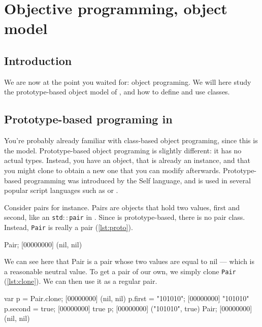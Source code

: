 \chapter{Objective programming, \urbi object model}
\label{section:objective}


\section{Introduction}

We are now at the point you waited for: object programing. We will
here study the prototype-based object model of \urbi, and how to
define and use classes.

\section{Prototype-based programing in \urbi}

You're probably already familiar with class-based object programing,
since this is the \Cxx model. Prototype-based object programing is
slightly different: it has no actual types. Instead, you have an
object, that is already an instance, and that you might clone to
obtain a new one that you can modify afterwards. Prototype-based
programming was introduced by the Self language, and is used in
several popular script languages such as \io or \js.

Consider pairs for instance. Pairs are objects that hold two values,
first and second, like an \texttt{std$::$pair} in \Cxx. Since \urbi is
prototype-based, there is no pair class. Instead, \lstinline|Pair| is
really a pair (\autoref{lst:proto}).

\begin{urbiscript}[caption=Prototypes in \urbi, label=lst:proto]
Pair;
[00000000] (nil, nil)
\end{urbiscript}

We can see here that Pair is a pair whose two values are equal to nil
--- which is a reasonable neutral value. To get a pair of our own, we
simply clone \lstinline|Pair| (\autoref{lst:clone}). We can then use it as a
regular pair.

\begin{urbiscript}[caption=Cloning, label=lst:clone]
var p = Pair.clone;
[00000000] (nil, nil)
p.first = "101010";
[00000000] "101010"
p.second = true;
[00000000] true
p;
[00000000] ("101010", true)
Pair;
[00000000] (nil, nil)
\end{urbiscript}

